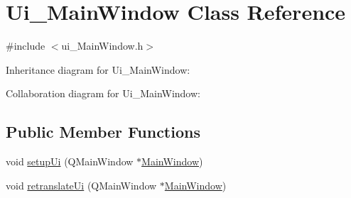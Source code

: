 \hypertarget{classUi__MainWindow}{}\section{Ui\+\_\+\+Main\+Window Class Reference}
\label{classUi__MainWindow}


{\ttfamily \#include $<$ui\+\_\+\+Main\+Window.\+h$>$}



Inheritance diagram for Ui\+\_\+\+Main\+Window\+:


Collaboration diagram for Ui\+\_\+\+Main\+Window\+:
\subsection*{Public Member Functions}
\begin{DoxyCompactItemize}
\item 
void \hyperlink{classUi__MainWindow_acf4a0872c4c77d8f43a2ec66ed849b58}{setup\+Ui} (Q\+Main\+Window $\ast$\hyperlink{classMainWindow}{Main\+Window})
\item 
void \hyperlink{classUi__MainWindow_a097dd160c3534a204904cb374412c618}{retranslate\+Ui} (Q\+Main\+Window $\ast$\hyperlink{classMainWindow}{Main\+Window})
\end{DoxyCompactItemize}

